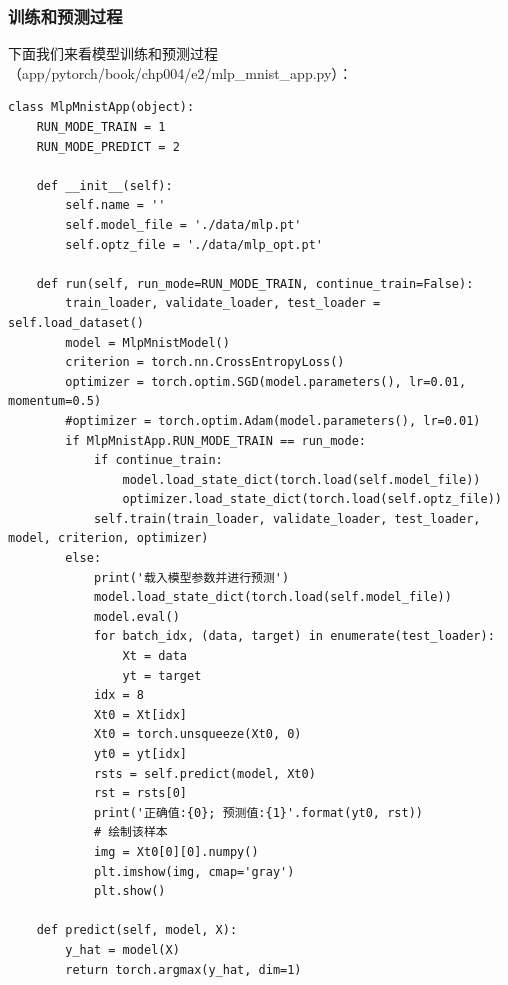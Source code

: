 \documentclass[UTF8]{article}
\begin{document}
\subsubsection{训练和预测过程}
下面我们来看模型训练和预测过程（app/pytorch/book/chp004/e2/mlp\_mnist\_app.py）：
\begin{lstlisting}
class MlpMnistApp(object):
    RUN_MODE_TRAIN = 1
    RUN_MODE_PREDICT = 2

    def __init__(self):
        self.name = ''
        self.model_file = './data/mlp.pt'
        self.optz_file = './data/mlp_opt.pt'

    def run(self, run_mode=RUN_MODE_TRAIN, continue_train=False):
        train_loader, validate_loader, test_loader = self.load_dataset()
        model = MlpMnistModel()
        criterion = torch.nn.CrossEntropyLoss()
        optimizer = torch.optim.SGD(model.parameters(), lr=0.01, momentum=0.5)
        #optimizer = torch.optim.Adam(model.parameters(), lr=0.01)
        if MlpMnistApp.RUN_MODE_TRAIN == run_mode:
            if continue_train:
                model.load_state_dict(torch.load(self.model_file))
                optimizer.load_state_dict(torch.load(self.optz_file))
            self.train(train_loader, validate_loader, test_loader, model, criterion, optimizer)
        else:
            print('载入模型参数并进行预测')
            model.load_state_dict(torch.load(self.model_file))
            model.eval()
            for batch_idx, (data, target) in enumerate(test_loader):
                Xt = data
                yt = target
            idx = 8
            Xt0 = Xt[idx]
            Xt0 = torch.unsqueeze(Xt0, 0)
            yt0 = yt[idx]
            rsts = self.predict(model, Xt0)
            rst = rsts[0]
            print('正确值:{0}; 预测值:{1}'.format(yt0, rst))
            # 绘制该样本
            img = Xt0[0][0].numpy()
            plt.imshow(img, cmap='gray')
            plt.show()

    def predict(self, model, X):
        y_hat = model(X)
        return torch.argmax(y_hat, dim=1)


\end{lstlisting}
\end{document}
